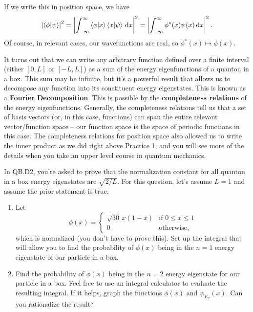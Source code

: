 \documentclass{article}
\begin{document}
\vspace{1em}

If we write this in position space, we have
\[
\left| \braket{\phi}{\psi} \right| ^2 = \left| \int_{-\infty}^\infty \braket{\phi}{x} \braket{x}{\psi}\, \dd x \right|^2 = \left| \int_{-\infty}^\infty \phi^*(x) \psi(x)\, \dd x \right|^2.
\]
Of course, in relevant cases, our wavefunctions are real, so $\phi^*(x) \mapsto \phi(x)$. 

\begin{tcolorbox}[arc=2mm, colback=magenta!15!white, colframe=magenta!80!black, title=\textsc{Function Space Decomposition (Enrichment)}]
    It turns out that we can write any arbitrary function defined over a finite interval (either $[0,L]$ or $[-L,L]$) as a sum of the energy eigenfunctions of a quanton in a box. This sum may be infinite, but it's a powerful result that allows us to decompose any function into its constituent energy eigenstates. This is known as a \textbf{Fourier Decomposition}. This is possible by the \textbf{completeness relations} of the energy eigenfunctions. Generally, the completeness relations tell us that a set of basis vectors (or, in this case, functions) can span the entire relevant vector/function space – our function space is the space of periodic functions in this case. The completeness relations for position space also allowed us to write the inner product as we did right above Practice 1, and you will see more of the details when you take an upper level course in quantum mechanics. 
\end{tcolorbox}

\begin{tcolorbox}[colframe=blue!50!black, arc=2mm, title=\textsc{Practice 3}]
    In QB.D2, you're asked to prove that the normalization constant for all quanton in a box energy eigenstates are $\sqrt{2 / L}$. For this question, let's assume $L=1$ and assume the prior statement is true.
    \begin{enumerate}[label=(\alph*)]
        \item Let 
        \[
        \phi(x) = \begin{cases}
            \sqrt{30}\,x(1-x) & \text{if } 0 \le x \le 1 \\
            0 & \text{otherwise},
        \end{cases}
        \]
        which is normalized (you don't have to prove this). Set up the integral that will allow you to find the probability of $\phi(x)$ being in the $n=1$ energy eigenstate of our particle in a box.
        \item Find the probability of $\phi(x)$ being in the $n=2$ energy eigenstate for our particle in a box. Feel free to use an integral calculator to evaluate the resulting integral. If it helps, graph the functions $\phi(x)$ and $\psi_{E_2}(x)$. Can you rationalize the result?
    \end{enumerate}
\end{tcolorbox}
\end{document}
